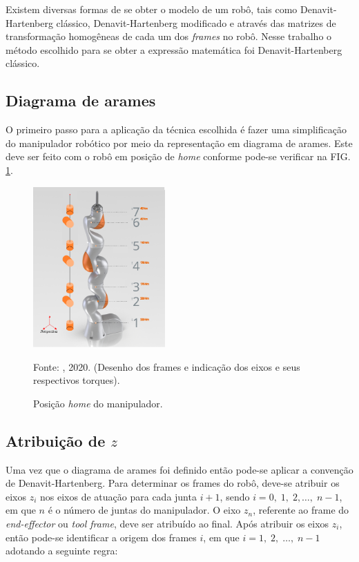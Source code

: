 Existem diversas formas de se obter o modelo de um robô, tais como Denavit-Hartenberg clássico, Denavit-Hartenberg modificado e através das matrizes de transformação homogêneas de cada um dos \textit{frames} no robô. Nesse trabalho o método escolhido para se obter a expressão matemática foi Denavit-Hartenberg clássico. 

\subsection{Diagrama de arames}
O primeiro passo para a aplicação da técnica escolhida é fazer uma simplificação do manipulador robótico por meio da representação em diagrama de arames. Este deve ser feito com o robô em posição de \textit{home} conforme pode-se verificar na FIG. \ref{fig:home}.

\begin{figure}[h]
    \centering
    \includegraphics[width=0.45\textwidth]{Imagem/Arames.eps}
    \caption{Posição \textit{home} do manipulador.}
    \label{fig:home}
    Fonte: \citeauthor{KUKA3D}, 2020. (Desenho dos frames e indicação dos eixos e seus respectivos torques).
\end{figure}

\subsection{Atribuição de \ensuremath{z}}
Uma vez que o diagrama de arames foi definido então pode-se aplicar a convenção de Denavit-Hartenberg. Para determinar os frames do robô, deve-se atribuir os eixos $z_i$ nos eixos de atuação para cada junta $i+1$, sendo $i = 0,\;1,\;2,\dots,\;n-1$, em que $n$ é o número de juntas do manipulador. O eixo $z_n$, referente ao frame do \textit{end-effector} ou \textit{tool frame}, deve ser atribuído ao final. Após atribuir os eixos $z_i$, então pode-se identificar a origem dos frames $i$, em que $i=1,\;2,\;\dots,\;n-1$ adotando a seguinte regra: 

